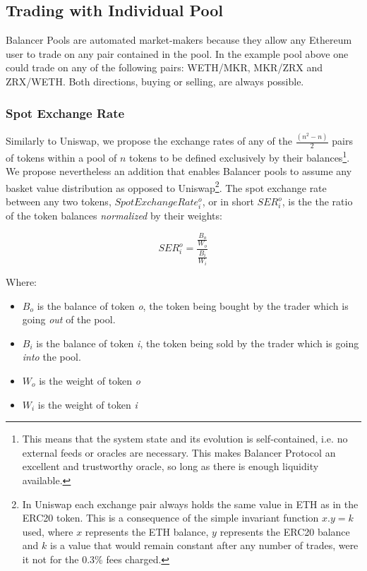 \documentclass[11pt]{amsart}
\begin{document}
\subsection{Trading with Individual Pool}
Balancer Pools are automated market-makers because they allow any Ethereum user to trade on any pair contained in the pool. In the example pool above one could trade on any of the following pairs: WETH/MKR, MKR/ZRX and ZRX/WETH. Both directions, buying or selling, are always possible.

\subsubsection{Spot Exchange Rate}
Similarly to Uniswap, we propose the exchange rates of any of the $\frac{(n^2 - n)}{2}$ pairs of tokens within a pool of $n$ tokens to be defined exclusively by their balances\footnote{This means that the system state and its evolution is self-contained, i.e. no external feeds or oracles are necessary. This makes Balancer Protocol an excellent and trustworthy oracle, so long as there is enough liquidity available.}. We propose nevertheless an addition that enables Balancer pools to assume any basket value distribution as opposed to Uniswap\footnote{In Uniswap each exchange pair always holds the same value in ETH as in the ERC20 token. This is a consequence of the simple invariant function $x.y=k$ used, where $x$ represents the ETH balance, $y$ represents the ERC20 balance and $k$ is a value that would remain constant after any number of trades, were it not for the 0.3\% fees charged.}. The spot exchange rate between any two tokens, $SpotExchangeRate^{o}_{i}$, or in short $SER^{o}_{i}$, is the the ratio of the token balances \textit{normalized} by their weights:

\begin{equation}
\label{equation:SER}
SER^{o}_{i} = \frac{\frac{B_{o}}{W_{o}}}{\frac{B_{i}}{W_{i}}}
\end{equation}

Where:
\begin{itemize}
    \item $B_{o}$ is the balance of token \textit{o}, the token being bought by the trader which is going \textit{out} of the pool.
    \item $B_{i}$ is the balance of token \textit{i}, the token being sold by the trader which is going \textit{into} the pool.
    \item $W_{o}$ is the weight of token \textit{o}
    \item $W_{i}$ is the weight of token \textit{i}

\end{itemize}
\end{document}
